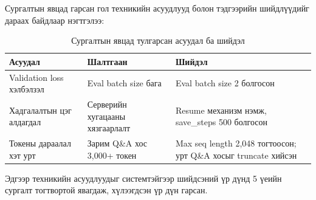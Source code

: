 Сургалтын явцад гарсан гол техникийн асуудлууд болон тэдгээрийн шийдлүүдийг дараах байдлаар нэгтгэлээ:

\begin{table}[H]
\centering
\caption{Сургалтын явцад тулгарсан асуудал ба шийдэл}
\label{tab:training_issues}
\small
\begin{tabularx}{\textwidth}{>{\raggedright\arraybackslash}p{3.2cm}>{\raggedright\arraybackslash}p{4.0cm}>{\raggedright\arraybackslash}X}
\hline
\textbf{Асуудал} & \textbf{Шалтгаан} & \textbf{Шийдэл} \\
\hline
Validation loss хэлбэлзэл & Eval batch size бага & Eval batch size 2 болгосон \\
Хадгалалтын цэг алдагдал & Серверийн хугацааны хязгаарлалт & Resume механизм нэмж, save\_steps 500 болгосон \\
Токены дараалал хэт урт & Зарим Q\&A хос 3,000+ токен & Max seq length 2,048 тогтоосон; урт Q\&A хосыг truncate хийсэн \\
\hline
\end{tabularx}
\end{table}

Эдгээр техникийн асуудлуудыг системтэйгээр шийдсэний үр дүнд 5 үеийн сургалт тогтвортой явагдаж, хүлээгдсэн үр дүн гарсан.
